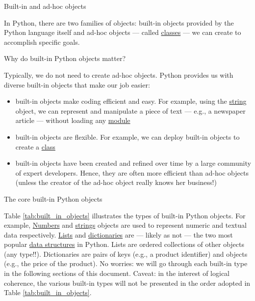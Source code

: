 \documentclass[a4paper,11pt]{book}
\numberwithin{figure}{chapter}
\numberwithin{table}{chapter}
\newcommand{\question}[1]{%
    \begin{tcolorbox}[colback=comp_c!10,colframe=comp_c,sidebyside align=top,width=\linewidth,before skip=1ex]
        #1
    \end{tcolorbox}
    \switchcolumn%
}
\newcommand{\note}[1]{%
    \begin{tcolorbox}[colback=white!0,colframe=white!10,width=\linewidth,before skip=1ex]
        #1
    \end{tcolorbox}
}
\begin{document}
\begin{paracol}{2}
    \question{\raggedright Built-in and ad-hoc objects}
    \note{In Python, there are two families of objects: built-in objects provided by the Python language itself and ad-hoc objects --- called \href{https://docs.python.org/3/tutorial/classes.html}{classes} --- we can create to accomplish specific goals.}
\end{paracol}

\begin{paracol}{2}
    \question{\raggedright Why do built-in Python objects matter?} 
    \note{
    Typically, we do not need to create ad-hoc objects. Python provides us with diverse built-in objects that make our job easier:
    \begin{itemize}
    	\item built-in objects make coding efficient and easy. For example, using the \href{https://docs.python.org/3/tutorial/introduction.html\#strings}{string} object, we can represent and manipulate a piece of text --- e.g., a newspaper article --- without loading any \href{https://docs.python.org/3/tutorial/modules.html}{module}
    	\item built-in objects are flexible. For example, we can deploy built-in objects to create a \href{https://docs.python.org/3/tutorial/classes.html}{class}
    	\item built-in objects have been created and refined over time by a large community of expert developers. Hence, they are  often  more  efficient  than  ad-hoc objects (unless the creator of the ad-hoc object really knows her business!)
    \end{itemize}
    }
\end{paracol}
\clearpage

\begin{paracol}{2}
    \question{\raggedright The core built-in Python objects} 
	\note{Table \ref{tab:built_in_objects} illustrates the types of built-in Python objects. For example, \href{https://docs.python.org/3/tutorial/introduction.html\#numbers}{Numbers} and \href{https://docs.python.org/3/tutorial/introduction.html\#strings}{strings} objects are used to represent numeric and textual data respectively. \href{https://docs.python.org/3/tutorial/introduction.html\#lists}{Lists} and \href{https://docs.python.org/3/tutorial/datastructures.html\#dictionaries}{dictionaries} are --- likely as not --- the two most popular \href{https://docs.python.org/3/tutorial/datastructures.html}{data structures} in Python. Lists are ordered collections of other objects (any type!!). Dictionaries are pairs of keys (e.g., a product identifier) and objects (e.g., the price of the product). No worries: we will go through each built-in type in the following sections of this document. Caveat: in the interest of logical coherence, the various built-in types will not be presented in the order adopted in Table \ref{tab:built_in_objects}.} 
\end{paracol}
\end{document}
